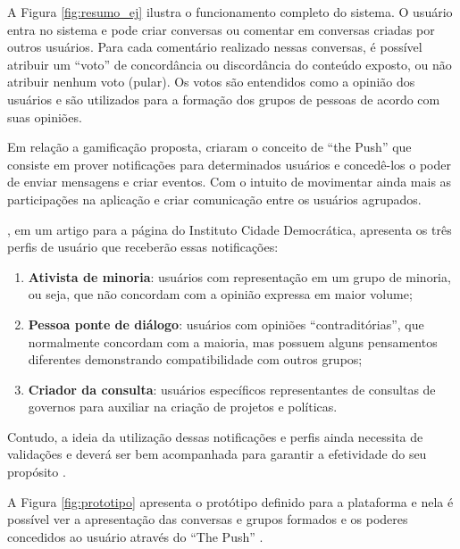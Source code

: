 A Figura \ref{fig:resumo_ej} ilustra o funcionamento completo do sistema. O usuário entra no sistema e pode criar conversas ou
comentar em conversas criadas por outros usuários. Para cada comentário realizado nessas conversas, é possível atribuir um 
``voto'' de concordância ou discordância do conteúdo exposto, ou não atribuir nenhum voto (pular).
Os votos são entendidos como a opinião dos usuários e são utilizados para a formação dos grupos de pessoas de acordo com suas opiniões. 

Em relação a gamificação proposta,  criaram o conceito de ``the Push'' que consiste
em prover notificações para determinados usuários e concedê-los o poder de enviar mensagens e criar eventos. Com 
o intuito de movimentar ainda mais as participações na aplicação e criar comunicação entre os usuários agrupados.

, em um artigo para a página do Instituto Cidade Democrática, apresenta os três perfis de usuário
que receberão essas notificações:

\begin{enumerate}
  \item \textbf{Ativista de minoria}: usuários com representação em um grupo de minoria, ou seja, que não concordam com a opinião 
    expressa em maior volume;
  \item \textbf{Pessoa ponte de diálogo}: usuários com opiniões ``contraditórias'', que normalmente concordam com a maioria, mas
    possuem alguns pensamentos diferentes demonstrando compatibilidade com outros grupos;
  \item \textbf{Criador da consulta}: usuários específicos representantes de consultas de governos para auxiliar na criação de projetos
  e políticas.
\end{enumerate}


Contudo, a ideia da utilização dessas notificações e perfis ainda necessita de validações e deverá ser bem
acompanhada para garantir a efetividade do seu propósito \cite{empurrandojuntos, parra}. 

A Figura \ref{fig:prototipo} apresenta o protótipo definido para a plataforma e nela é possível ver a apresentação das conversas
e grupos formados e os poderes concedidos ao usuário através do ``The Push'' \cite{parra}.


